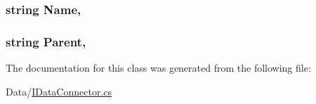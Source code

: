 \subsubsection[{Name}]{\setlength{\rightskip}{0pt plus 5cm}string Name\hspace{0.3cm}{\ttfamily [get]}, {\ttfamily [set]}}\label{classOTA_1_1Data_1_1Group_a7ee9065718e6628dc7791b756fa6c0f9}
\hypertarget{classOTA_1_1Data_1_1Group_a08af004a8b78a8e9eab64e7f1fda042c}{}
\subsubsection[{Parent}]{\setlength{\rightskip}{0pt plus 5cm}string Parent\hspace{0.3cm}{\ttfamily [get]}, {\ttfamily [set]}}\label{classOTA_1_1Data_1_1Group_a08af004a8b78a8e9eab64e7f1fda042c}


The documentation for this class was generated from the following file\+:\begin{DoxyCompactItemize}
\item 
Data/\hyperlink{IDataConnector_8cs}{I\+Data\+Connector.\+cs}\end{DoxyCompactItemize}
